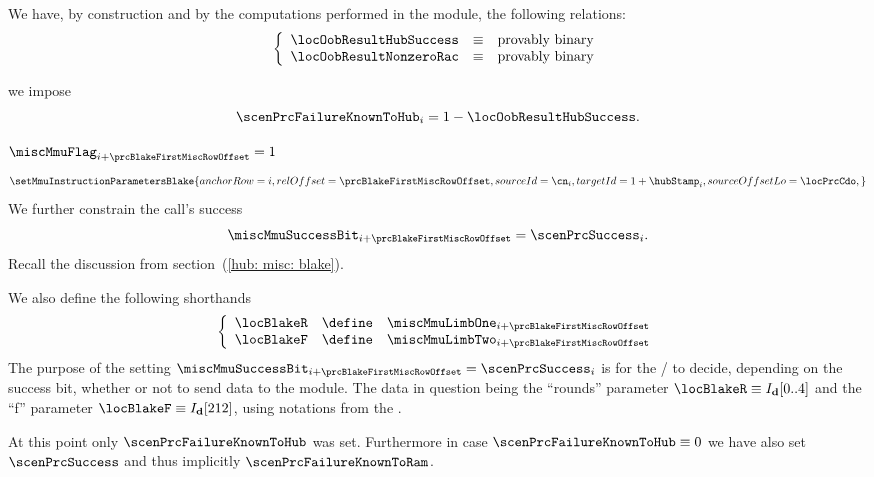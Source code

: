 \begin{description}
\begin{description}
				\saNote{} \label{hub: instruction handling: call: precompiles: blake: generalities: oob shorthands are provably binary}
				We have, by construction and by the computations performed in the \oobMod{} module, the following relations:
				\[
					\left\{ \begin{array}{lcl}
					        \locOobResultHubSuccess & \equiv & \text{provably binary} \\
					        \locOobResultNonzeroRac & \equiv & \text{provably binary} \\
					\end{array} \right.
				\]
			\item[\underline{Setting \scenPrcFailureKnownToHub{}:}] 
				we impose
				\[
					\scenPrcFailureKnownToHub_{i} = 1 - \locOobResultHubSuccess.
				\]
			\item[\underline{Setting the \mmuMod{} instruction:}]
				\If $\miscMmuFlag_{i + \prcBlakeFirstMiscRowOffset} = 1$ \Then
				\[
					\setMmuInstructionParametersBlake {
						anchorRow      = i                           ,
						relOffset      = \prcBlakeFirstMiscRowOffset ,
						sourceId       = \cn_{i}                     ,
						targetId       = 1 + \hubStamp_{i}           ,
						sourceOffsetLo = \locPrcCdo                  ,
					}
				\]
				We further constrain the call's success
				\[
					\miscMmuSuccessBit_{i + \prcBlakeFirstMiscRowOffset}
					=
					\scenPrcSuccess_{i}.
				\]
				\saNote{} Recall the discussion from section~(\ref{hub: misc: blake}).

				\saNote{} We also define the following shorthands
				\[
					\left\{ \begin{array}{lcl} \label{hub: instruction handling: call: precompiles: blake: shorthands}
						\locBlakeR & \define & \miscMmuLimbOne _{i + \prcBlakeFirstMiscRowOffset} \\
						\locBlakeF & \define & \miscMmuLimbTwo _{i + \prcBlakeFirstMiscRowOffset} \\
					\end{array} \right.
				\]
				\saNote{}
				The purpose of the setting $\miscMmuSuccessBit _{i + \prcBlakeFirstMiscRowOffset} = \scenPrcSuccess _{i}$ is for the \mmuMod{} / \mmioMod{} to decide, depending on the success bit, whether or not to send data to the \blakeDataMod{} module.
				The data in question being the ``rounds'' parameter $\locBlakeR \equiv I_\textbf{d}[0..4]$ and the ``f'' parameter $\locBlakeF \equiv I_\textbf{d}[212]$, using notations from the \cite{EYP-London}.

				\saNote{}
				At this point only $\scenPrcFailureKnownToHub$ was set.
				Furthermore in case $\scenPrcFailureKnownToHub \equiv 0$ we have also set $\scenPrcSuccess$ and thus implicitly $\scenPrcFailureKnownToRam$.
		\end{description}
	\end{description}
